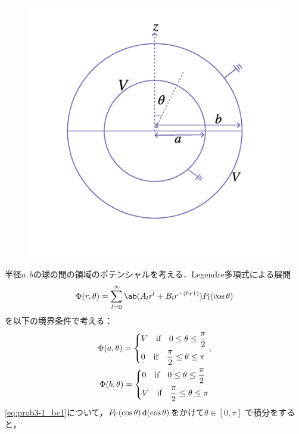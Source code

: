 \begin{figure}%
  \centering
  \includegraphics[width=\linewidth]{fig/Jackson3-1.pdf}%
\end{figure}
半径$a, b$の球の間の領域のポテンシャルを考える．Legendre多項式による展開
\begin{gather}%
  \Phi(r, \theta) = \sum_{l=0}^\infty \ab(A_l r^l + B_l r^{-(l+1)}) P_l (\cos\theta)
\end{gather}
を以下の境界条件で考える：
\begin{gather}%
  \label{eq:prob3-1_bc1}
  \Phi(a,\theta) =
  \begin{dcases}%
    V \qqtext{if} 0 \leq \theta \leq \frac{\pi}{2}\\
    0 \qqtext{if} \frac{\pi}{2} \leq \theta \leq \pi
  \end{dcases},\\
  \label{eq:prob3-1_bc2}
  \Phi(b,\theta) =
  \begin{dcases}%
    0 \qqtext{if} 0 \leq \theta \leq \frac{\pi}{2}\\
    V \qqtext{if} \frac{\pi}{2} \leq \theta \leq \pi
  \end{dcases}%
\end{gather}%
\eqref{eq:prob3-1_bc1}について，$P_{l'}(\cos\theta)\dl{(\cos\theta)}$をかけて$\theta\in[0,\pi]$
で積分をすると，
